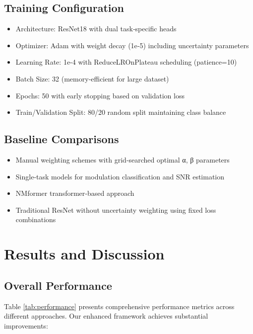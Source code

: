 \documentclass{ELSP}
\begin{document}
\subsection{Training Configuration}
\begin{itemize}
\item Architecture: ResNet18 with dual task‑specific heads
\item Optimizer: Adam with weight decay (1e‑5) including uncertainty parameters
\item Learning Rate: 1e‑4 with ReduceLROnPlateau scheduling (patience=10)
\item Batch Size: 32 (memory‑efficient for large dataset)
\item Epochs: 50 with early stopping based on validation loss
\item Train/Validation Split: 80/20 random split maintaining class balance
\end{itemize}

\subsection{Baseline Comparisons}
\begin{itemize}
\item Manual weighting schemes with grid‑searched optimal α, β parameters
\item Single‑task models for modulation classification and SNR estimation
\item NMformer transformer‑based approach \cite{kong2023nmformer}
\item Traditional ResNet without uncertainty weighting using fixed loss combinations
\end{itemize}

\section{Results and Discussion}

\subsection{Overall Performance}

Table \ref{tab:performance} presents comprehensive performance metrics across different approaches. Our enhanced framework achieves substantial improvements:
\end{document}
